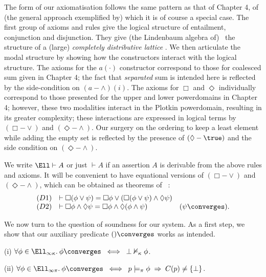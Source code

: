 The form of our axiomatisation follows the same pattern as that of
Chapter 4, of (the general approach exemplified by) which it is of course a
special case.
The first group of axioms and rules give the logical structure of
entailment, conjunction and disjunction.
They give (the Lindenbaum algebra of) \Ellinfty\ the structure of a (large)
{\em completely distributive lattice} \cite{Joh82}.
We then articulate the modal structure by showing how the 
constructors interact with the logical structure.
The axioms for the $a( \cdot )$ constructor correspond to those for coalesced
sum given in Chapter 4; the fact that {\em separated} sum is intended here
is reflected by the side-condition on $(a-{\wedge})(i)$.
The axioms for $\Box$ and $\Diamond$ individually correspond to those
presented for the upper and lower powerdomains in Chapter 4; however,
these two modalities interact in the Plotkin powerdomain, resulting in its
greater complexity; these interactions are expressed in logical terms by
$({\Box}-{\vee})$ and $({\Diamond}-{\wedge})$.
Our surgery on the ordering to keep a least element while adding the empty
set is reflected by the presence of $({\Diamond}-\true )$ and the side
condition on $({\Diamond}-{\wedge})$.

We write $\Ell  \vdash  A$ or just $\vdash  A$ if an assertion $A$ is
derivable from the above rules and axioms.
It will be convenient to have equational versions of $({\Box}-{\vee})$ and
$({\Diamond}-{\wedge})$, which can be obtained as theorems of \Ell\ :
\[ \begin{array}{clr}
(D1) & \vdash  \Box ( \phi \vee \psi ) = \Box \phi \vee ( \Box (\phi \vee
\psi ) \wedge \Diamond \psi )  & \\
(D2) & \vdash  \Box \phi \wedge \Diamond \psi = \Box \phi \wedge
\Diamond (\phi \wedge \psi )  & (\psi {\converges}) .
\end{array} \]

We now turn to the question of soundness for our system.
As a first step, we show that our auxiliary predicate $(){\converges}$
works as intended.

\begin{proposition}
\label{auxp}
(i)  $\forall \phi \in \Ell_{\infty \kappa}. \: \phi \converges \;\;
\Longleftrightarrow \;\;  \bot \nvDash_{\kappa} \phi$. 

\noindent (ii) $\forall \phi \in \Ell_{\infty \pi}. \: \phi \converges \;\;
\Longleftrightarrow \;\;  p \models_{\pi} \phi \; \Rightarrow \; C(p) \not=
\{ \bot \}$.
\end{proposition}

